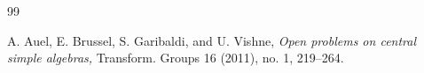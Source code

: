 \documentclass[11pt]{amsart}
\theoremstyle{plain}
\theoremstyle{definition}
\theoremstyle{remark}
\newcommand{\BP}{{\mathbb{P}}}
\begin{document}
\begin{thebibliography}{99}






 A. Auel, E. Brussel, S. Garibaldi, and U.  Vishne, {\em Open problems on central simple algebras,} Transform. Groups 16 (2011), no. 1, 219--264.








\end{thebibliography}
\end{document}
